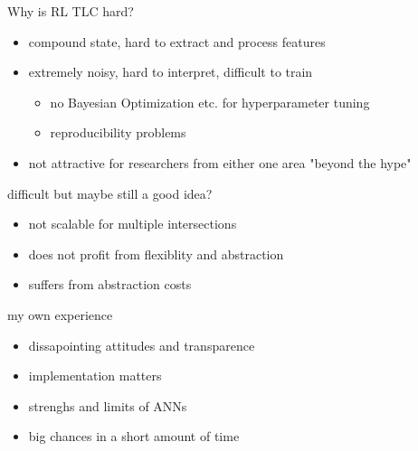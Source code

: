 \begin{frame}{Why is RL TLC hard?}
    \begin{itemize}
        \item compound state, hard to extract and process features
        \item extremely noisy, hard to interpret, difficult to train
         \begin{itemize}
                \item no Bayesian Optimization etc. for hyperparameter tuning
                \item reproducibility problems
            \end{itemize}
        \item not attractive for researchers from either one area "beyond the hype"
    \end{itemize}
    
\end{frame}

\begin{frame}{difficult but maybe still a good idea?}
    \begin{itemize}
        \item \alert{not scalable for multiple intersections}
        \item does not profit from flexiblity and abstraction
        \item suffers from abstraction costs
    \end{itemize}
\end{frame}

\begin{frame}{my own experience}
    \begin{itemize}
        \item dissapointing attitudes and transparence
        \item implementation matters
        \item strenghs and limits of ANNs
        \item big chances in a short amount of time
    \end{itemize}
\end{frame}